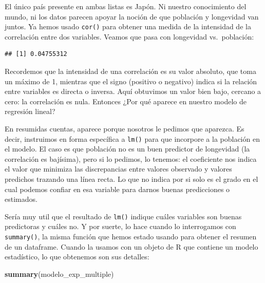 \documentclass[]{book}
\newenvironment{Shaded}{\begin{snugshade}}{\end{snugshade}}
\newcommand{\KeywordTok}[1]{\textcolor[rgb]{0.13,0.29,0.53}{\textbf{#1}}}
\newcommand{\DecValTok}[1]{\textcolor[rgb]{0.00,0.00,0.81}{#1}}
\newcommand{\OperatorTok}[1]{\textcolor[rgb]{0.81,0.36,0.00}{\textbf{#1}}}
\newcommand{\NormalTok}[1]{#1}
\begin{document}
El único país presente en ambas listas es Japón. Ni nuestro conocimiento
del mundo, ni los datos parecen apoyar la noción de que población y
longevidad van juntos. Ya hemos usado \texttt{cor()} para obtener una
medida de la intensidad de la correlación entre dos variables. Veamos
que pasa con longevidad vs.~población:

\begin{Shaded}
\end{Shaded}

\begin{verbatim}
## [1] 0.04755312
\end{verbatim}

Recordemos que la intensidad de una correlación es su valor absoluto,
que toma un máximo de 1, mientras que el signo (positivo o negativo)
indica si la relación entre variables es directa o inversa. Aquí
obtuvimos un valor bien bajo, cercano a cero: la correlación es nula.
Entonces ¿Por qué aparece en nuestro modelo de regresión lineal?

En resumidas cuentas, aparece porque nosotros le pedimos que aparezca.
Es decir, instruimos en forma específica a \texttt{lm()} para que
incorpore a la población en el modelo. El caso es que población no es un
buen predictor de longevidad (la correlación es bajísima), pero si lo
pedimos, lo tenemos: el coeficiente nos indica el valor que minimiza las
discrepancias entre valores observado y valores predichos trazando una
línea recta. Lo que no indica por si solo es el grado en el cual podemos
confiar en esa variable para darnos buenas predicciones o estimados.

Sería muy util que el resultado de \texttt{lm()} indique cuáles
variables son buenas predictoras y cuáles no. Y por suerte, lo hace
cuando lo interrogamos con \texttt{summary()}, la misma función que
hemos estado usando para obtener el resumen de un dataframe. Cuando la
usamos con un objeto de R que contiene un modelo estadístico, lo que
obtenemos son sus detalles:

\begin{Shaded}
\begin{Highlighting}[]
\KeywordTok{summary}\NormalTok{(modelo_exp_multiple)}
\end{Highlighting}
\end{Shaded}
\end{document}
